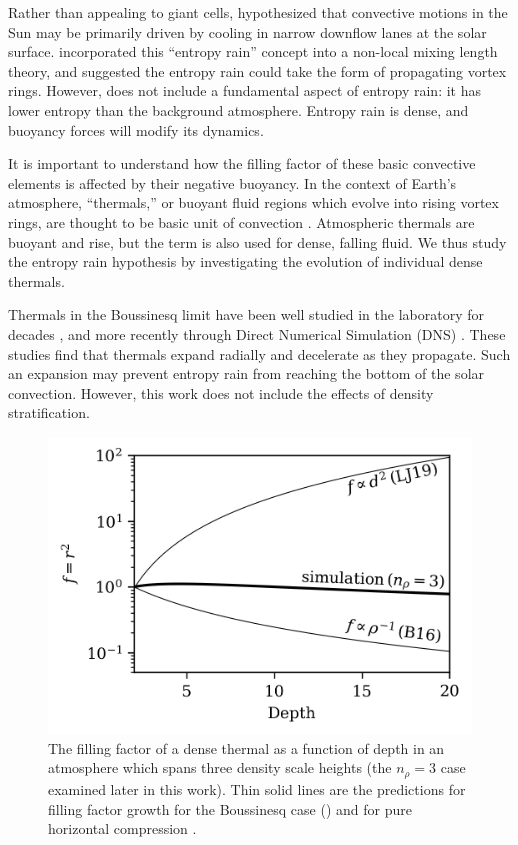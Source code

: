 \documentclass[twocolumn, amsmath, amsfonts, amssymb, trackchanges]{aastex62}
\newcommand{\LJ}{\citetalias{lecoanet&jeevanjee2018}}
\begin{document}
Rather than appealing to giant cells, \cite{spruit1997} hypothesized that convective motions in the Sun may be primarily driven by cooling in narrow downflow lanes at the solar surface.
\citet{brandenburg2016} incorporated this ``entropy rain'' concept into a non-local mixing length theory, and suggested the entropy rain could take the form of propagating vortex rings. 
However, \citet{brandenburg2016} does not include a fundamental aspect of entropy rain: it has lower entropy than the background atmosphere.
Entropy rain is dense, and buoyancy forces will modify its dynamics.

It is important to understand how the filling factor of these basic convective elements is affected by their negative buoyancy. 
In the context of Earth's atmosphere, ``thermals,'' or buoyant fluid regions which evolve into rising vortex rings, are thought to be basic unit of convection \citep[e.g.,][]{romps2015}. 
Atmospheric thermals are buoyant and rise, but the term is also used for dense, falling fluid.
We thus study the entropy rain hypothesis by investigating the evolution of individual dense thermals.

Thermals in the Boussinesq limit have been well studied in the laboratory for decades \citep[see e.g.][]{morton&all1956, scorer1957}, and more recently through Direct Numerical Simulation (DNS) \citep{lecoanet&jeevanjee2018}. 
These studies find that thermals expand radially and decelerate as they propagate.
Such an expansion may prevent entropy rain from reaching the bottom of the solar convection.
However, this work does not include the effects of density stratification.

\begin{figure}[t!]
    \includegraphics[width=\columnwidth]{overview_fig.png}
    \caption{
	The filling factor of a dense thermal as a function of depth in an atmosphere which spans three density scale heights (the $n_\rho = 3$ case examined later in this work). 
	Thin solid lines are the predictions for filling factor growth for the Boussinesq case (\LJ) and for pure horizontal compression \citep{brandenburg2016}.
    \label{fig:overview} }
\end{figure}
\end{document}
